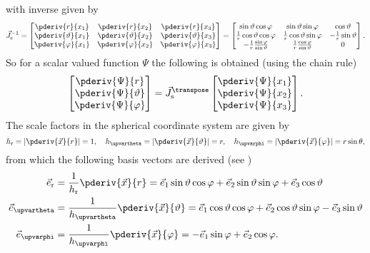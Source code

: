 with inverse given by
\begin{equation}
	\vec{J}_{\mathrm{s}}^{-1} = \begin{bmatrix}
		\pderiv{r}{x_1} & \pderiv{r}{x_2} & \pderiv{r}{x_3}\\
		\pderiv{\vartheta}{x_1} & \pderiv{\vartheta}{x_2} & \pderiv{\vartheta}{x_3}\\
		\pderiv{\varphi}{x_1} & \pderiv{\varphi}{x_2} & \pderiv{\varphi}{x_3}
	\end{bmatrix} = \begin{bmatrix}
		\sin\vartheta\cos\varphi & \sin\vartheta\sin\varphi & \cos\vartheta\\
		\frac{1}{r}\cos\vartheta\cos\varphi & \frac{1}{r}\cos\vartheta\sin\varphi & -\frac{1}{r}\sin\vartheta\\
		-\frac{1}{r}\frac{\sin\varphi}{\sin\vartheta} & \frac{1}{r}\frac{\cos\varphi}{\sin\vartheta} & 0
	\end{bmatrix}.
\end{equation}
So for a scalar valued function $\Psi$ the following is obtained (using the chain rule)
\begin{equation}
\label{Eq1:derivativesInSphericalCoordinates}
	\begin{bmatrix}
		\pderiv{\Psi}{r}\\
		\pderiv{\Psi}{\vartheta}\\
		\pderiv{\Psi}{\varphi}
	\end{bmatrix} = \vec{J}_{\mathrm{s}}^{\transpose} 
	\begin{bmatrix}
		\pderiv{\Psi}{x_1}\\
		\pderiv{\Psi}{x_2}\\
		\pderiv{\Psi}{x_3}
	\end{bmatrix}.
\end{equation}
The scale factors in the spherical coordinate system are given by
\begin{equation}
	h_{\mathrm{r}} = \left|\pderiv{\vec{x}}{r}\right| = 1,\quad h_\upvartheta = \left|\pderiv{\vec{x}}{\vartheta}\right| = r,\quad h_\upvarphi = \left|\pderiv{\vec{x}}{\varphi}\right| = r\sin\theta,
\end{equation}
from which the following basis vectors are derived (see )
\begin{align}
	\vec{e}_{\mathrm{r}} &= \frac{1}{h_{\mathrm{r}}}\pderiv{\vec{x}}{r} = \vec{e}_1\sin\vartheta\cos\varphi + \vec{e}_2\sin\vartheta\sin\varphi + \vec{e}_3\cos\vartheta\\
	\vec{e}_{\upvartheta} &= \frac{1}{h_\upvartheta}\pderiv{\vec{x}}{\vartheta} = \vec{e}_1\cos\vartheta\cos\varphi + \vec{e}_2\cos\vartheta\sin\varphi - \vec{e}_3\sin\vartheta\\
	\vec{e}_{\upvarphi} &= \frac{1}{h_\upvarphi}\pderiv{\vec{x}}{\varphi} = -\vec{e}_1\sin\varphi + \vec{e}_2\cos\varphi.
\end{align}
